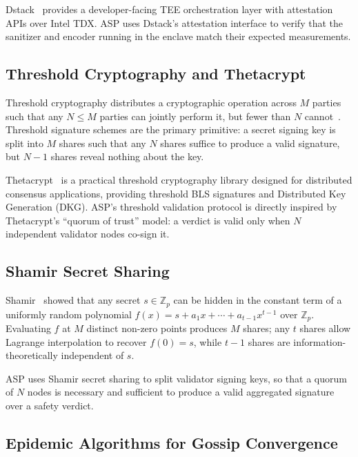 \documentclass[sigconf,natbib=false]{acmart}
\begin{document}
Dstack~\cite{dstack2024} provides a developer-facing TEE orchestration
layer with attestation APIs over Intel TDX. ASP uses Dstack's attestation
interface to verify that the sanitizer and encoder running in the enclave
match their expected measurements.

\subsection{Threshold Cryptography and Thetacrypt}
\label{sec:bg:threshold}

Threshold cryptography distributes a cryptographic operation across $M$ parties
such that any $N \leq M$ parties can jointly perform it, but fewer than $N$
cannot~\cite{desmedt1987society}. Threshold signature schemes are the
primary primitive: a secret signing key is split into $M$ shares such that
any $N$ shares suffice to produce a valid signature, but $N-1$ shares reveal
nothing about the key.

Thetacrypt~\cite{thetacrypt2024} is a practical threshold cryptography
library designed for distributed consensus applications, providing
threshold BLS signatures and Distributed Key Generation (DKG). ASP's
threshold validation protocol is directly inspired by Thetacrypt's
``quorum of trust'' model: a verdict is valid only when $N$ independent
validator nodes co-sign it.

\subsection{Shamir Secret Sharing}
\label{sec:bg:shamir}

Shamir~\cite{shamir1979share} showed that any secret $s \in \mathbb{Z}_p$
can be hidden in the constant term of a uniformly random polynomial
$f(x) = s + a_1 x + \cdots + a_{t-1} x^{t-1}$ over $\mathbb{Z}_p$.
Evaluating $f$ at $M$ distinct non-zero points produces $M$ shares; any
$t$ shares allow Lagrange interpolation to recover $f(0) = s$, while
$t-1$ shares are information-theoretically independent of $s$.

ASP uses Shamir secret sharing to split validator signing keys, so that
a quorum of $N$ nodes is necessary and sufficient to produce a valid
aggregated signature over a safety verdict.

\subsection{Epidemic Algorithms for Gossip Convergence}
\label{sec:bg:gossip}
\end{document}
